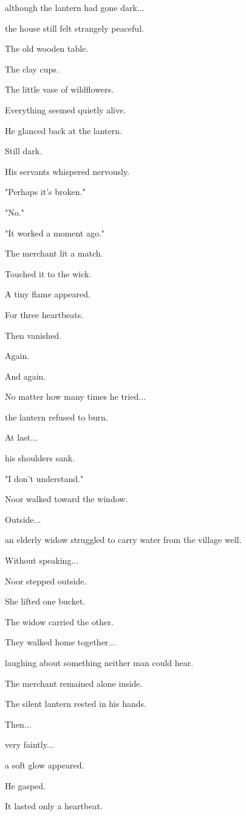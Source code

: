 \documentclass[12pt,openany]{book}
\begin{document}
although the lantern had gone dark...

the house still felt strangely peaceful.

The old wooden table.

The clay cups.

The little vase of wildflowers.

Everything seemed quietly alive.

He glanced back at the lantern.

Still dark.

His servants whispered nervously.

"Perhaps it's broken."

"No."

"It worked a moment ago."

The merchant lit a match.

Touched it to the wick.

A tiny flame appeared.

For three heartbeats.

Then vanished.

Again.

And again.

No matter how many times he tried...

the lantern refused to burn.

At last...

his shoulders sank.

"I don't understand."

Noor walked toward the window.

Outside...

an elderly widow struggled to carry water from the village well.

Without speaking...

Noor stepped outside.

She lifted one bucket.

The widow carried the other.

They walked home together...

laughing about something neither man could hear.

The merchant remained alone inside.

The silent lantern rested in his hands.

Then...

very faintly...

a soft glow appeared.

He gasped.

It lasted only a heartbeat.
\end{document}
